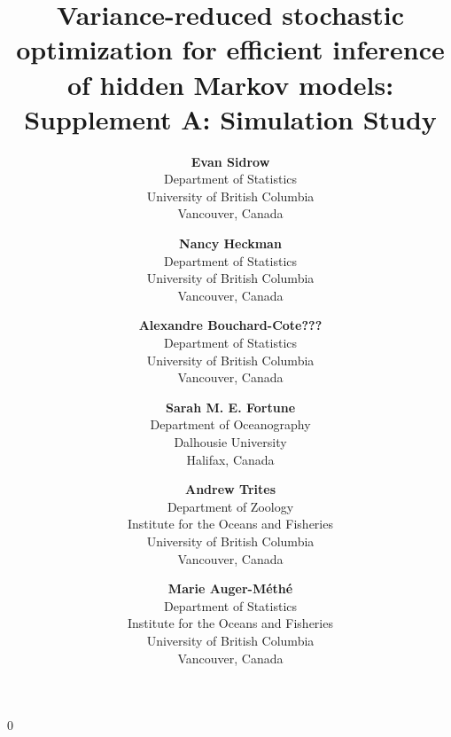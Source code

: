 \documentclass[12pt]{article}
\newcommand{\blind}{0}
\begin{document}
%

\def\spacingset#1{\renewcommand{\baselinestretch}%
{#1}\small\normalsize} \spacingset{1}


\blind
{
    \title{Variance-reduced stochastic optimization for efficient inference of hidden Markov models: Supplement A: Simulation Study}
    
    \author{
      \textbf{Evan Sidrow} \\
      Department of Statistics \\
      University of British Columbia\\
      Vancouver, Canada \\
      \and
      \textbf{Nancy Heckman} \\
      Department of Statistics \\
      University of British Columbia \\
      Vancouver, Canada \\
      \and
      \textbf{Alexandre Bouchard-Cote???} \\
      Department of Statistics \\
      University of British Columbia \\
      Vancouver, Canada \\
      \and
      \textbf{Sarah M. E. Fortune} \\
      Department of Oceanography \\
      Dalhousie University \\
      Halifax, Canada \\
      \and
      \textbf{Andrew Trites} \\
      Department of Zoology \\
      Institute for the Oceans and Fisheries \\
      University of British Columbia \\
      Vancouver, Canada \\
      \and
      \textbf{Marie Auger-M\'eth\'e} \\
      Department of Statistics \\
      Institute for the Oceans and Fisheries \\
      University of British Columbia \\
      Vancouver, Canada \\
    }
    \maketitle
} \fi
\end{document}
